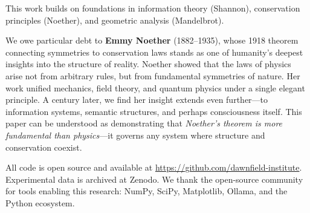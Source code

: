 \documentclass[11pt,a4paper]{article}
\begin{document}
This work builds on foundations in information theory (Shannon), conservation principles (Noether), and geometric analysis (Mandelbrot). 

We owe particular debt to \textbf{Emmy Noether} (1882--1935), whose 1918 theorem connecting symmetries to conservation laws stands as one of humanity's deepest insights into the structure of reality. Noether showed that the laws of physics arise not from arbitrary rules, but from fundamental symmetries of nature. Her work unified mechanics, field theory, and quantum physics under a single elegant principle. A century later, we find her insight extends even further---to information systems, semantic structures, and perhaps consciousness itself. This paper can be understood as demonstrating that \emph{Noether's theorem is more fundamental than physics}---it governs any system where structure and conservation coexist.

All code is open source and available at \url{https://github.com/dawnfield-institute}. Experimental data is archived at Zenodo. We thank the open-source community for tools enabling this research: NumPy, SciPy, Matplotlib, Ollama, and the Python ecosystem.
\end{document}
